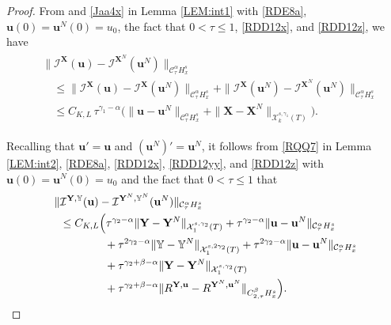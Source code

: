 \documentclass[letterpaper, 11pt,  reqno]{amsart}
\newcommand{\1}{\hspace{0.5mm}\textup{I}\hspace{0.5mm}}
\newcommand{\I}{\mathcal{I}}
\newcommand{\noi}{\noindent}
\newcommand{\CC}{\mathcal{C}}
\newcommand{\al}{\alpha}
\newcommand{\be}{\beta}
\newcommand{\g}{\gamma}
\newcommand{\les}{\lesssim}
\newcommand{\cX}{\mathcal{X}}
\newcommand{\uu}{\mathbf{u}}
\newcommand{\YYb}{\mathbb{Y}}
\newcommand{\XX}{\mathbf{X}}
\newcommand{\YY}{\mathbf{Y}}
\numberwithin{equation}{section}
\numberwithin{theorem}{section}
\begin{document}
\begin{proof}
\noi
From 
 \cite[(3.64)]{CGLLO1}
and \eqref{Jaa4x} in 
Lemma \ref{LEM:int1} with \eqref{RDE8a}, 
  $\uu(0) = \uu^N(0) = u_0$, 
the fact that $0 < \tau \le 1$, 
\eqref{RDD12x}, 
and \eqref{RDD12z}, 
we have
\begin{align}
\begin{split}
& \| \I^\XX(\uu)- \I^{\XX^N}(\uu^N)\|_{\CC^\al_\tau H^s_x}
\\
&  \quad \le 
\| \I^\XX(\uu) - \I^\XX(\uu^N)\|_{\CC^\al_\tau H^s_x}
+ \| \I^\XX(\uu^N)- \I^{\XX^N}(\uu^N)\|_{\CC^\al_\tau H^s_x}\\
& \quad \le C_{K, L} \,
\tau^{\g_1- \al} 
\Big(
 \| \uu - \uu^N \|_{\CC^\al_\tau H^s_x}
+ 
 \|\XX - \XX^N\|_{\cX^{s, \g_1}_k(T)} \Big).
\end{split}
\label{RDD12a}
\end{align}





Recalling that
 $\uu' = \uu$ and 
 $(\uu^N)' = \uu^N$, 
 it follows from 
 \eqref{RQQ7} in Lemma \ref{LEM:int2},  
 \eqref{RDE8a}, 
 \eqref{RDD12x}, 
\eqref{RDD12yy}, and 
\eqref{RDD12z}
 with $\uu(0) = \uu^N(0) = u_0$
 and the fact that $0 < \tau \le 1$
 that 
\begin{align}
\begin{split}
 \| & \I^{\YY, \YYb}(\uu)
- \I^{\YY^N, \YYb^N}(\uu^N)\|_{\CC^\al_\tau H^s_x}\\
& \le
C_{K, L}\Big(  \tau^{\g_2 - \al}
\|\YY- \YY^N\|_{\cX^{s, \g_2}_1(T)}
+ 
 \tau^{\g_2 - \al}
\|\uu -\uu^N\|_{\CC^\al_\tau H^s_x}\\
& \quad 
\hphantom{lXXX}
+ \tau^{2\g_2 - \al}
\|\YYb- \YYb^N\|_{\cX^{s, 2\g_2}_1(T)}
+ \tau^{2\g_2 - \al}
\|\uu -\uu^N\|_{\CC^\al_\tau H^s_x}\\
& \quad 
\hphantom{lXXX}
+   \tau^{\g_2 + \be- \al }
\|\YY - \YY^N\|_{\cX^{s, \g_2}_1(T)}
\\
& \quad 
\hphantom{lXXX}
+ 
\tau^{\g_2 + \be- \al }
\| R^{\YY, \uu} - R^{\YY^N, \uu^N}\|_{C^\be_{2,\tau}H^s_x}\Big).
\end{split}
\label{RDD12b}
\end{align}



\end{proof}
\end{document}
